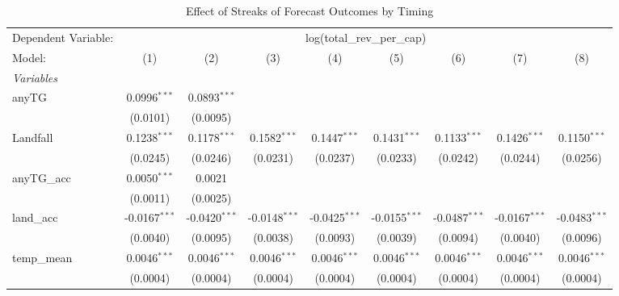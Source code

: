 \documentclass{article}
\begin{document}
\begin{appendices}
\begin{table}[htbp]
   \caption{Effect of Streaks of Forecast Outcomes by Timing}
   \centering
   \begin{tabular}{lcccccccc}
      \tabularnewline \midrule \midrule
      Dependent Variable: & \multicolumn{8}{c}{log(total\_rev\_per\_cap)}\\
      Model:             & (1)             & (2)             & (3)             & (4)                    & (5)             & (6)             & (7)             & (8)\\  
      \midrule
      \emph{Variables}\\
      anyTG              & 0.0996$^{***}$  & 0.0893$^{***}$  &                 &                        &                 &                 &                 &   \\   
                         & (0.0101)        & (0.0095)        &                 &                        &                 &                 &                 &   \\   
      Landfall           & 0.1238$^{***}$  & 0.1178$^{***}$  & 0.1582$^{***}$  & 0.1447$^{***}$         & 0.1431$^{***}$  & 0.1133$^{***}$  & 0.1426$^{***}$  & 0.1150$^{***}$\\   
                         & (0.0245)        & (0.0246)        & (0.0231)        & (0.0237)               & (0.0233)        & (0.0242)        & (0.0244)        & (0.0256)\\   
      anyTG\_acc         & 0.0050$^{***}$  & 0.0021          &                 &                        &                 &                 &                 &   \\   
                         & (0.0011)        & (0.0025)        &                 &                        &                 &                 &                 &   \\   
      land\_acc          & -0.0167$^{***}$ & -0.0420$^{***}$ & -0.0148$^{***}$ & -0.0425$^{***}$        & -0.0155$^{***}$ & -0.0487$^{***}$ & -0.0167$^{***}$ & -0.0483$^{***}$\\   
                         & (0.0040)        & (0.0095)        & (0.0038)        & (0.0093)               & (0.0039)        & (0.0094)        & (0.0040)        & (0.0096)\\   
      temp\_mean         & 0.0046$^{***}$  & 0.0046$^{***}$  & 0.0046$^{***}$  & 0.0046$^{***}$         & 0.0046$^{***}$  & 0.0046$^{***}$  & 0.0046$^{***}$  & 0.0046$^{***}$\\   
                         & (0.0004)        & (0.0004)        & (0.0004)        & (0.0004)               & (0.0004)        & (0.0004)        & (0.0004)        & (0.0004)\\   

\end{tabular}
\end{table}
\end{appendices}
\end{document}
